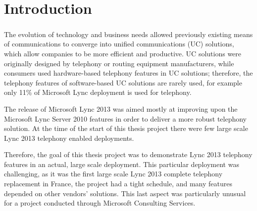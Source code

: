 
\chapter{Introduction}


\paragraph{}
The evolution of technology and business needs allowed previously existing means of communications to converge into unified communications (UC) solutions, which allow companies to be more efficient and productive. UC solutions were originally designed by telephony or routing equipment manufacturers, while consumers used hardware-based telephony features in UC solutions; therefore, the telephony features of software-based UC solutions are rarely used, for example only 11\% of Microsoft Lync deployment is used for telephony\cite{elizabeth_harrin_unified_2013}.

The release of Microsoft Lync 2013 was aimed mostly at improving upon the Microsoft Lync Server 2010 features in order to deliver a more robust telephony solution. At the time of the start of this thesis project there were few large scale Lync 2013 telephony enabled deployments.

Therefore, the goal of this thesis project was to demonstrate Lync 2013 telephony features in an actual, large scale deployment. This particular deployment was challenging, as it was the first large scale Lync 2013 complete telephony replacement in France, the project had a tight schedule, and many features depended on other vendors' solutions. This last aspect was particularly unusual for a project conducted through Microsoft Consulting Services.

